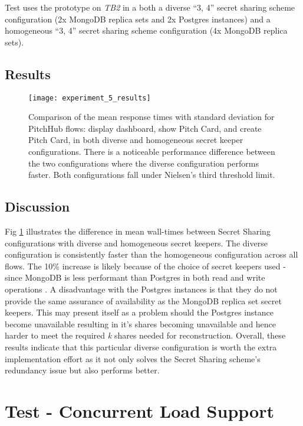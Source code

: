 Test  uses the prototype on \textit{TB2} in a both a diverse ``3, 4'' secret sharing scheme configuration (2x MongoDB replica sets and 2x Postgres instances) and a homogeneous ``3, 4'' secret sharing scheme configuration (4x MongoDB replica sets).

\subsection{Results}

\begin{figure}[ht]
    \centering
    \texttt{[image: experiment\_5\_results]}
    \caption{Comparison of the mean response times with standard deviation for PitchHub flows: display dashboard, show Pitch Card, and create Pitch Card, in both diverse and homogeneous secret keeper configurations. There is a noticeable performance difference between the two configurations where the diverse configuration performs faster. Both configurations fall under Nielsen's third threshold limit.}
    \label{fig:test_5_results}
\end{figure}

\subsection{Discussion}
Fig \ref{fig:test_5_results} illustrates the difference in mean wall-times between Secret Sharing configurations with diverse and homogeneous secret keepers. The diverse configuration is consistently faster than the homogeneous configuration across all flows. The 10\% increase is likely because of the choice of secret keepers used - since MongoDB is less performant than Postgres in both read and write operations \cite{van2012sensor}. 
A disadvantage with the Postgres instances is that they do not provide the same assurance of availability as the MongoDB replica set secret keepers. This may present itself as a problem should the Postgres instance become unavailable resulting in it's shares becoming unavailable and hence harder to meet the required \textit{k} shares needed for reconstruction. 
Overall, these results indicate that this particular diverse configuration is worth the extra implementation effort as it not only solves the Secret Sharing scheme's redundancy issue but also performs better. 

\section{Test  - Concurrent Load Support}
